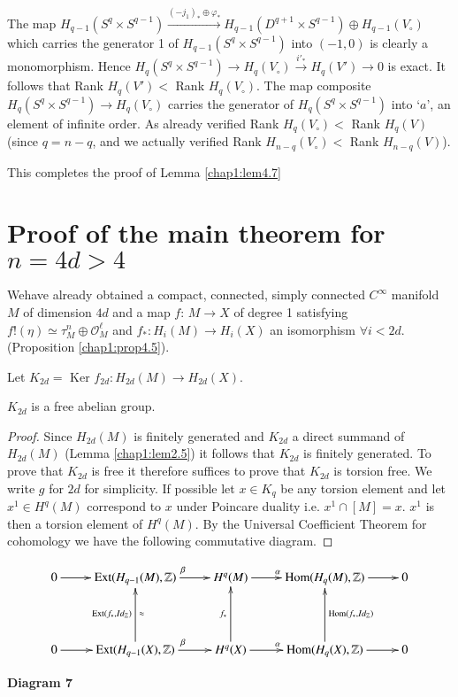 The map $H_{q-1} (S^q \times S^{q-1}) \xrightarrow{(-j_1)_* \oplus
  \varphi_*} H_{q-1} (D^{q+1} \times S^{q-1}) \oplus H_{q-1}(V_\circ)$
which carries the generator 1 of $H_{q-1} (S^q \times S^{q-1})$ into
$(-1, 0)$ is clearly a monomorphism. Hence $H_q (S^q \times S^{q-1})
\to H_q (V_\circ) \xrightarrow{i'_*} H_q (V') \to 0$ is exact. It follows
that Rank $H_q (V')<$ Rank $H_q (V_\circ)$. The map composite $H_q (S^q \times
S^{q-1}) \to H_q (V_\circ)$ carries the generator of $H_q (S^q \times
S^{q-1})$ into `$a$', an element of infinite order. As already
verified Rank $H_q (V_\circ)<$ Rank $H_q (V)$ (since $q = n -q$, and
we actually verified Rank $H_{n-q} (V_\circ)<$ Rank $H_{n-q}(V)$). 

This completes the proof of Lemma \ref{chap1:lem4.7}


\section{Proof of the main theorem for $n = 4 d >
  4$}\label{chap1:sec5} %

We\pageoriginale have already obtained a compact, connected, simply
connected 
$C^\infty$ manifold $M$ of dimension $4d$ and a map $f$: $M \to X$ of
degree 1 satisfying $f! (\eta ) \simeq \tau^n_M \oplus
\mathscr{O}^\ell_M$ and $f_*: H_i (M) \to H_i (X)$ an isomorphism
$\forall i < 2d$. (Proposition \ref{chap1:prop4.5}).  

Let $K_{2 d} = \text{ Ker } 
f_{2d} : H_{2d} (M) \to H_{2d} (X)$.  

\begin{lemma}\label{chap1:lem5.1}%
$K_{2d}$ is a free abelian group.
\end{lemma}

\begin{proof}
Since $H_{2d}(M)$ is finitely generated and $K_{2d}$ a direct summand
of $H_{2d}(M)$ (Lemma \ref{chap1:lem2.5}) it follows that $K_{2d}$ is finitely
generated. To prove that $K_{2d}$ is free it therefore suffices to
prove that $K_{2d}$ is torsion free. We write $g$ for
$2d$ for simplicity. If possible let $x \in K_q$ be any torsion
element and let $x^1 \in H^q (M)$ correspond to $x$ under
Poincare duality i.e. $x^1 \cap [M] = x$. $x^1$ is then a torsion
element of $H^q (M)$. By the Universal Coefficient Theorem for
cohomology we have the following commutative diagram. 
\end{proof}
\[
\xymatrix@R=1.5cm{
  0 \ar[r] & \Ext (H_{q-1} (M), \mathbb{Z}) \ar[r]^{\beta} & H^q(M)
  \ar[r]^{\alpha} & \Hom (H_q(M), \mathbb{Z}) \ar[r] & 0 \\
0 \ar[r] & \Ext (H_{q-1}(X),\mathbb{Z}) \ar[r]^{\beta}
\ar[u]_{\approx}^{\Ext (f_*, Id_{\mathbb{Z}})} & H^q (X)
\ar[r]^{\alpha} \ar[u]^{f_*} & \Hom(H_q (X), \mathbb{Z}) \ar[r]
\ar[u]_{\Hom (f_*,   Id_{\mathbb{Z}})} & 0   
}
\]
\begin{center}
{\bf Diagram 7}
\end{center}


